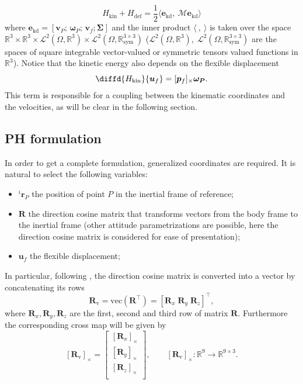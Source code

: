 \documentclass{svjour3}                     %
\newcommand{\crmat}[1]{\ensuremath{[#1]_{\times}}}
\begin{document}
\begin{equation}
H_{\text{kin}} + H_{\text{def}} = \frac{1}{2} \langle \bm{e}_{\text{kd}}, \ \bm{\mathcal{M}} \bm{e}_{\text{kd}} \rangle
\end{equation}
where $\bm{e}_{\text{kd}} = [\bm{v}_P; \, \bm{\omega}_P; \, \bm{v}_f; \bm{\Sigma}]$ and the inner product $\langle \ , \ \rangle$ is taken over the space $\mathbb{R}^3 \times \mathbb{R}^3 \times \mathscr{L}^2(\Omega, \mathbb{R}^3) \times \mathscr{L}^2(\Omega, \mathbb{R}^{3\times 3}_{\text{sym}})$ ($\mathscr{L}^2(\Omega, \mathbb{R}^3), \; \mathscr{L}^2(\Omega, \mathbb{R}^{3\times 3}_{\text{sym}})$ are the spaces of square integrable vector-valued or symmetric tensors valued functions in $\mathbb{R}^3$). Notice that the kinetic energy also depends on the flexible displacement
\[
\diffd{H_{\text{kin}}}{\bm{u}_f} = \crmat{\bm{p}_f} \bm{\omega_{P}}.
\]
This term is responsible for a coupling between the kinematic coordinates and the velocities, as will be clear in the following section. 

\subsection{PH formulation}
In order to get a complete formulation, generalized coordinates are required. It is natural to select the following variables:
\begin{itemize}
	\item $^i \bm{r}_P$ the position of point $P$ in the inertial frame of reference;
	\item $\bm{R}$ the direction cosine matrix that transforms vectors from the body frame to the inertial frame (other attitude parametrizations are possible, here the direction cosine matrix is considered for ease of presentation);
	\item $\bm{u}_f$ the flexible displacement;
\end{itemize}

In particular, following \cite{attitude_ph}, the direction cosine matrix is converted into a vector by concatenating its rows
\begin{equation*}
\bm{R}_{\text{v}} = \text{vec}(\bm{R}^\top) = [\bm{R}_x \; \bm{R}_y \; \bm{R}_z]^\top,
\end{equation*}
where $\bm{R}_{x}, \bm{R}_{y}, \bm{R}_{z}$ are the first, second and third row of matrix $\bm{R}$. Furthermore the corresponding cross map will be given by
\begin{equation*}
\crmat{\bm{R}_{\text{v}}} = 
\begin{bmatrix}
\crmat{\bm{R}_x} \\
\crmat{\bm{R}_y} \\
\crmat{\bm{R}_z} \\
\end{bmatrix}, \qquad 
\crmat{\bm{R}_{\text{v}}} : \mathbb{R}^9 \rightarrow \mathbb{R}^{9 \times 3}.
\end{equation*}
\end{document}
